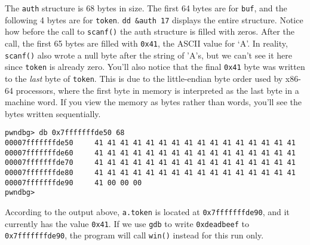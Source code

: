 \documentclass{article}
\begin{document}
The \texttt{auth} structure is 68 bytes in size. The first 64 bytes are for
\texttt{buf}, and the following 4 bytes are for \texttt{token}. \texttt{dd
\&auth 17} displays the entire structure. Notice how before the call to
\texttt{scanf()} the auth structure is filled with zeros. After the call, the
first 65 bytes are filled with \texttt{0x41}, the ASCII value for `A'. In
reality, \texttt{scanf()} also wrote a null byte after the string of 'A's, but
we can't see it here since \texttt{token} is already zero. You'll also notice
that the final \texttt{0x41} byte was written to the \emph{last} byte of
\texttt{token}. This is due to the little-endian byte order used by x86-64
processors, where the first byte in memory is interpreted as the last byte in a
machine word. If you view the memory as bytes rather than words, you'll see the
bytes written sequentially.

\begin{lstlisting}
pwndbg> db 0x7fffffffde50 68
00007fffffffde50     41 41 41 41 41 41 41 41 41 41 41 41 41 41 41 41
00007fffffffde60     41 41 41 41 41 41 41 41 41 41 41 41 41 41 41 41
00007fffffffde70     41 41 41 41 41 41 41 41 41 41 41 41 41 41 41 41
00007fffffffde80     41 41 41 41 41 41 41 41 41 41 41 41 41 41 41 41
00007fffffffde90     41 00 00 00
pwndbg> 
\end{lstlisting}

According to the output above, \texttt{a.token} is located at
\texttt{0x7fffffffde90}, and it currently has the value \texttt{0x41}. If we use
\texttt{gdb} to write \texttt{0xdeadbeef} to \texttt{0x7fffffffde90}, the
program will call \texttt{win()} instead for this run only.
\end{document}
